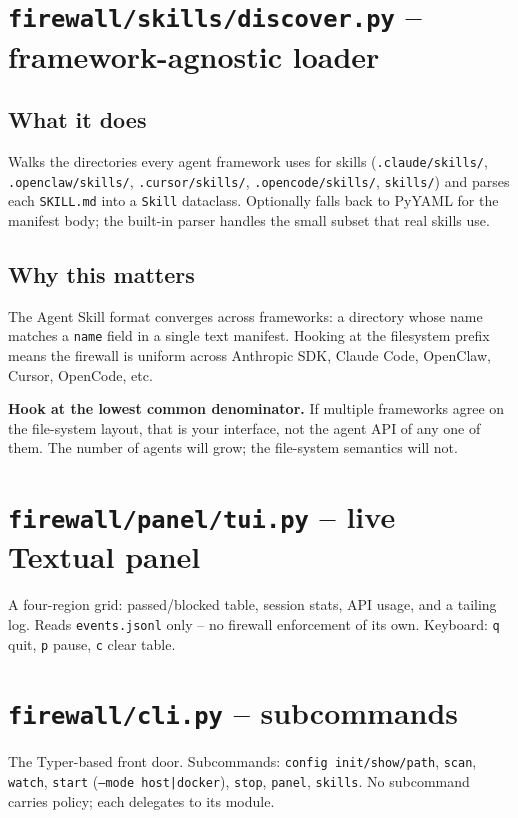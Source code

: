 \documentclass[11pt,a4paper]{article}
\begin{document}
\section{\texttt{firewall/skills/discover.py} -- framework-agnostic loader}

\subsection{What it does}
Walks the directories every agent framework uses for skills
(\texttt{.claude/skills/}, \texttt{.openclaw/skills/},
\texttt{.cursor/skills/}, \texttt{.opencode/skills/}, \texttt{skills/})
and parses each \texttt{SKILL.md} into a \texttt{Skill} dataclass.
Optionally falls back to PyYAML for the manifest body; the built-in
parser handles the small subset that real skills use.

\subsection{Why this matters}
The Agent Skill format converges across frameworks: a directory whose
name matches a \texttt{name} field in a single text manifest. Hooking
at the filesystem prefix means the firewall is uniform across
Anthropic SDK, Claude Code, OpenClaw, Cursor, OpenCode, etc.

\begin{tip}
\textbf{Hook at the lowest common denominator.} If multiple frameworks
agree on the file-system layout, that is your interface, not the agent
API of any one of them. The number of agents will grow; the file-system
semantics will not.
\end{tip}

\section{\texttt{firewall/panel/tui.py} -- live Textual panel}

A four-region grid: passed/blocked table, session stats, API usage,
and a tailing log. Reads \texttt{events.jsonl} only -- no firewall
enforcement of its own. Keyboard: \texttt{q} quit, \texttt{p} pause,
\texttt{c} clear table.

\section{\texttt{firewall/cli.py} -- subcommands}

The Typer-based front door. Subcommands:
\texttt{config init/show/path}, \texttt{scan}, \texttt{watch},
\texttt{start} (\texttt{--mode host|docker}), \texttt{stop},
\texttt{panel}, \texttt{skills}. No subcommand carries policy; each
delegates to its module.
\end{document}
